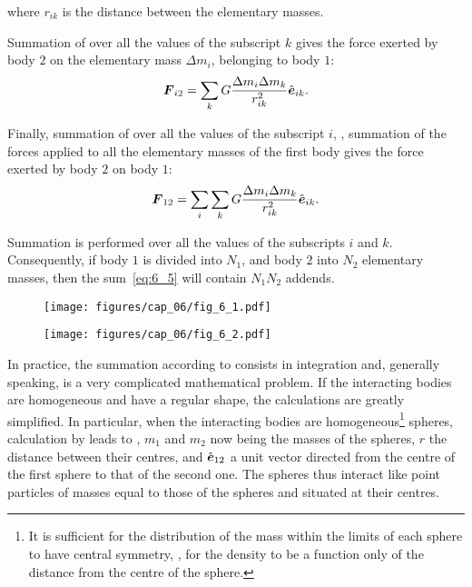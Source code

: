 \noindent
where $r_{ik}$ is the distance between the elementary masses.

Summation of  over all the values of the subscript $k$ gives the force exerted by body $2$ on the elementary mass $\Delta m_i$, belonging to body $1$:
\begin{equation}\label{eq:6_4}
	\boldsymbol{F}_{i2} = \sum_k G\frac{\Delta m_i\Delta m_k}{r_{ik}^2}\hat{\boldsymbol{e}}_{ik}.
\end{equation}

\noindent
Finally, summation of  over all the values of the subscript $i$, \ie, summation of the forces applied to all the elementary masses of the first body gives the force exerted by body $2$ on body $1$:
\begin{equation}\label{eq:6_5}
	\boldsymbol{F}_{12} = \sum_i \sum_k G\frac{\Delta m_i\Delta m_k}{r_{ik}^2}\hat{\boldsymbol{e}}_{ik}.
\end{equation}

\noindent
Summation is performed over all the values of the subscripts $i$ and $k$. Consequently, if body $1$ is divided into $N_1$, and body $2$ into $N_2$ elementary masses, then the sum~\eqref{eq:6_5} will contain $N_1N_2$ addends.

\begin{figure}[t]
	\begin{minipage}[t]{0.5\linewidth}
		\begin{center}
			\texttt{[image: figures/cap\_06/fig\_6\_1.pdf]}
			\caption[]{}
			\label{fig:6_1}
		\end{center}
	\end{minipage}
	\hspace{-0.05cm}
	\begin{minipage}[t]{0.5\linewidth}
		\begin{center}
			\texttt{[image: figures/cap\_06/fig\_6\_2.pdf]}
			\caption[]{}
			\label{fig:6_2}
		\end{center}
	\end{minipage}
	\vspace{-0.3cm}
\end{figure}

In practice, the summation according to  consists in integration and, generally speaking, is a very complicated mathematical problem. If the interacting bodies are homogeneous and have a regular shape, the calculations are greatly simplified. In particular, when the interacting bodies are homogeneous\footnote{It is sufficient for the distribution of the mass within the limits of each sphere to have central symmetry, \ie, for the density to be a function only of the	distance from the centre of the sphere.} spheres, calculation by  leads to , $m_1$ and $m_2$ now being the masses of the spheres, $r$ the distance between their centres, and $\hat{\boldsymbol{e}}_{12}$ a unit vector directed from the centre of the first sphere to that of the second one. The spheres thus interact like point particles of masses equal to those of the spheres and situated at their centres.

